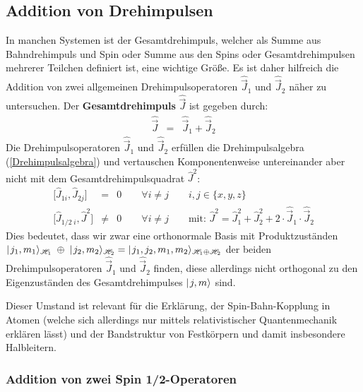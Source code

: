 %
%
%

\subsection{Addition von Drehimpulsen}

In manchen Systemen ist der Gesamtdrehimpuls, welcher als Summe aus Bahndrehimpuls und Spin oder Summe aus den Spins oder Gesamtdrehimpulsen mehrerer Teilchen definiert ist, eine wichtige Größe. Es ist daher hilfreich die Addition von zwei allgemeinen Drehimpulsoperatoren $\hat{\vec{J}}_1$ und $\hat{\vec{J}}_2$ näher zu untersuchen. Der {\bf Gesamtdrehimpuls} $\hat{\vec{J}}$ ist gegeben durch: 
\begin{eqnarray*}
\hat{\vec{J}} &=& \hat{\vec{J}}_1+\hat{\vec{J}}_2
\end{eqnarray*}
Die Drehimpulsoperatoren $\hat{\vec{J}}_1$ und $\hat{\vec{J}}_2$ erfüllen die Drehimpulsalgebra (\ref{Drehimpulsalgebra}) und vertauschen Komponentenweise untereinander aber nicht mit dem Gesamtdrehimpulsquadrat $\hat{J}^2$: 
\begin{eqnarray*}
	\big[\hat{J}_{1i},\hat{J}_{2j}\big] &=& 0 \qquad \forall i\neq j \qquad i,j\in\{x,y,z\}
	\\
	\big[\hat{J}_{1/2\;i},\hat{J}^2\big] &\neq& 0 \qquad \forall i\neq j \qquad \text{mit: } \hat{J}^2=\hat{J}_1^2+\hat{J}_2^2+2\cdot\hat{\vec{J}}_1\cdot\hat{\vec{J}}_2
\end{eqnarray*}
Dies bedeutet, dass wir zwar eine orthonormale Basis mit Produktzuständen $\ket{j_1,m_1}_{\hil_1}\;\oplus\\\ket{j_2,m_2}_{\hil_2}=\;\ket{j_1,j_2,m_1,m_2}_{\hil_1\oplus\hil_2}$ der beiden Drehimpulsoperatoren $\hat{\vec{J}}_1$ und $\hat{\vec{J}}_2$ finden, diese allerdings nicht orthogonal zu den Eigenzuständen des Gesamtdrehimpulses $\mid\!\!\!\,\,{j,m}\rangle$ sind. 

Dieser Umstand ist relevant für die Erklärung, der Spin-Bahn-Kopplung in Atomen (welche sich allerdings nur mittels relativistischer Quantenmechanik erklären lässt) und der Bandstruktur von Festkörpern und damit insbesondere Halbleitern. 


\subsubsection{Addition von zwei Spin 1/2-Operatoren}

